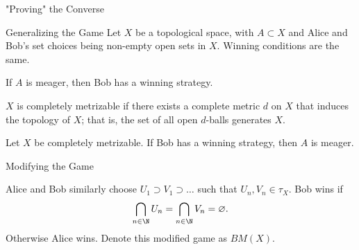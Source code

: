 \documentclass{beamer}
\begin{document}
\begin{frame}{"Proving" the Converse}
{
    }

\end{frame}

\begin{frame}{Generalizing the Game}
    Let $X$ be a topological space, with $A \subset X$ and Alice and Bob's set choices being non-empty open sets in $X$. Winning conditions are the same.

    \pause

    \begin{theorem}
        If $A$ is meager, then Bob has a winning strategy.
    \end{theorem}

    \pause

    \begin{definition}
        $X$ is completely metrizable if there exists a complete metric $d$ on $X$ that induces the topology of $X$; that is, the set of all open $d$-balls generates $X$.
    \end{definition}

    \pause

    \begin{theorem}
        Let $X$ be completely metrizable. If Bob has a winning strategy, then $A$ is meager.
    \end{theorem}
\end{frame}

\begin{frame}{Modifying the Game}

    \begin{definition}
        Alice and Bob similarly choose $U_1 \supset V_1 \supset \ldots$ such that $U_n, V_n \in \tau_X$. Bob wins if
        \[
            \bigcap_{n \in \N} U_n = \bigcap_{n \in \N} V_n = \varnothing
        .\]
        Otherwise Alice wins. Denote this modified game as $BM(X)$.
    \end{definition}
\end{frame}
\end{document}
